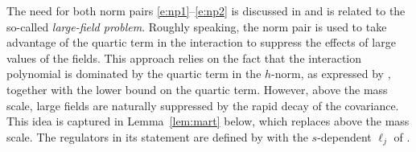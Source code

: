 The need for both norm pairs \eqref{e:np1}--\eqref{e:np2} is discussed in
\cite[Section~\ref{IE-sec:lfp}]{BS-rg-IE} and is related to the
so-called \emph{large-field problem}. Roughly speaking, the
norm pair  is used to take advantage of the quartic term in the interaction to
suppress the effects of large values of the fields. This approach
relies on the fact that the interaction polynomial is dominated by the
quartic term in the $h$-norm, as expressed by
\cite[\eqref{IE-e:tau2dom}]{BS-rg-IE}, together with the lower bound
\cite[\eqref{IE-e:epVbark0}]{BS-rg-IE} on the quartic term.
However, above the mass scale, large fields are naturally suppressed
by the rapid decay of the covariance.
This idea is captured in Lemma~\ref{lem:mart} below, which replaces
\cite[Lemma~\ref{IE-lem:mart}]{BS-rg-IE} above the mass scale.
The regulators in its statement are defined by  with the $s$-dependent
$\ell_j$ of .


